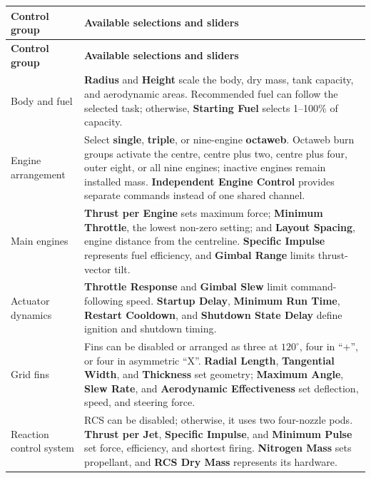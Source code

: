 \begin{longtable}{>{\raggedright\arraybackslash}p{} >{\raggedright\arraybackslash}p{}}
\toprule
\textbf{Control group} & \textbf{Available selections and sliders} \\
\midrule
\endfirsthead
\toprule
\textbf{Control group} & \textbf{Available selections and sliders} \\
\midrule
\endhead
Body and fuel & \textbf{Radius} and \textbf{Height} scale the body, dry mass, tank capacity, and aerodynamic areas. Recommended fuel can follow the selected task; otherwise, \textbf{Starting Fuel} selects 1--100\% of capacity. \\
\addlinespace
Engine arrangement & Select \textbf{single}, \textbf{triple}, or nine-engine \textbf{octaweb}. Octaweb burn groups activate the centre, centre plus two, centre plus four, outer eight, or all nine engines; inactive engines remain installed mass. \textbf{Independent Engine Control} provides separate commands instead of one shared channel. \\
\addlinespace
Main engines & \textbf{Thrust per Engine} sets maximum force; \textbf{Minimum Throttle}, the lowest non-zero setting; and \textbf{Layout Spacing}, engine distance from the centreline. \textbf{Specific Impulse} represents fuel efficiency, and \textbf{Gimbal Range} limits thrust-vector tilt. \\
\addlinespace
Actuator dynamics & \textbf{Throttle Response} and \textbf{Gimbal Slew} limit command-following speed. \textbf{Startup Delay}, \textbf{Minimum Run Time}, \textbf{Restart Cooldown}, and \textbf{Shutdown State Delay} define ignition and shutdown timing. \\
\addlinespace
Grid fins & Fins can be disabled or arranged as three at $120^{\circ}$, four in ``+'', or four in asymmetric ``X''. \textbf{Radial Length}, \textbf{Tangential Width}, and \textbf{Thickness} set geometry; \textbf{Maximum Angle}, \textbf{Slew Rate}, and \textbf{Aerodynamic Effectiveness} set deflection, speed, and steering force. \\
\addlinespace
Reaction control system & RCS can be disabled; otherwise, it uses two four-nozzle pods. \textbf{Thrust per Jet}, \textbf{Specific Impulse}, and \textbf{Minimum Pulse} set force, efficiency, and shortest firing. \textbf{Nitrogen Mass} sets propellant, and \textbf{RCS Dry Mass} represents its hardware. \\
\bottomrule
\end{longtable}

